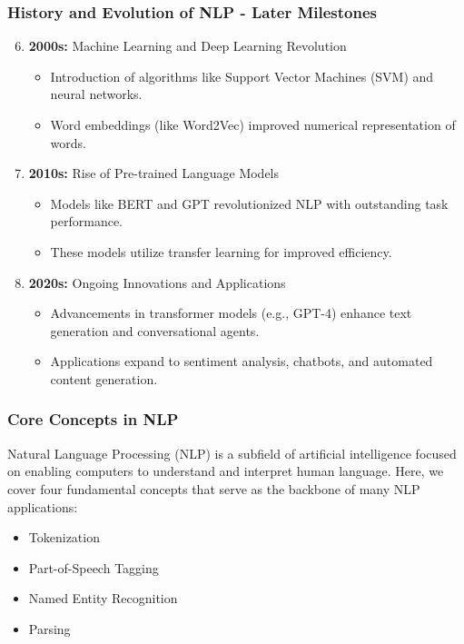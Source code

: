 \documentclass[aspectratio=169]{beamer}
\begin{document}
\begin{frame}[fragile]
    \frametitle{History and Evolution of NLP - Later Milestones}
    \begin{enumerate}
        \setcounter{enumi}{5}
        \item \textbf{2000s:} Machine Learning and Deep Learning Revolution
            \begin{itemize}
                \item Introduction of algorithms like Support Vector Machines (SVM) and neural networks.
                \item Word embeddings (like Word2Vec) improved numerical representation of words.
            \end{itemize}
        \item \textbf{2010s:} Rise of Pre-trained Language Models
            \begin{itemize}
                \item Models like BERT and GPT revolutionized NLP with outstanding task performance.
                \item These models utilize transfer learning for improved efficiency.
            \end{itemize}
        \item \textbf{2020s:} Ongoing Innovations and Applications
            \begin{itemize}
                \item Advancements in transformer models (e.g., GPT-4) enhance text generation and conversational agents.
                \item Applications expand to sentiment analysis, chatbots, and automated content generation.
            \end{itemize}
    \end{enumerate}
\end{frame}

\begin{frame}
    \frametitle{Core Concepts in NLP}
    Natural Language Processing (NLP) is a subfield of artificial intelligence focused on enabling computers to understand and interpret human language. Here, we cover four fundamental concepts that serve as the backbone of many NLP applications:
    \begin{itemize}
        \item Tokenization
        \item Part-of-Speech Tagging
        \item Named Entity Recognition
        \item Parsing
    \end{itemize}
\end{frame}
\end{document}
